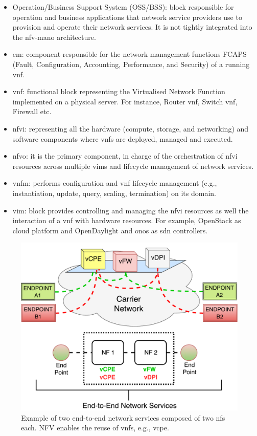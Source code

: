 \begin{itemize}
\item Operation/Business Support System (OSS/BSS): block responsible for operation and business applications that network service providers use to provision and operate their network services. It is not tightly integrated into the \gls{nfv}-\gls{mano} architecture.
\item \gls{em}: component responsible for the network management functions FCAPS (Fault, Configuration, Accounting, Performance, and Security) of a running \gls{vnf}.
\item \gls{vnf}: functional block representing the Virtualised Network Function implemented on a physical server. For instance, Router \gls{vnf}, Switch \gls{vnf}, Firewall etc.
\item \gls{nfvi}: representing all the hardware (compute, storage, and networking) and software components where \glspl{vnf} are deployed, managed and executed. 
\item \gls{nfvo}: it is the primary component, in charge of the orchestration of \gls{nfvi} resources across multiple \glspl{vim} and lifecycle management of network services. 
\item \gls{vnfm}: performs configuration and \gls{vnf} lifecycle management (e.g., instantiation, update, query, scaling, termination) on its domain.
\item \gls{vim}: block provides controlling and managing the \gls{nfvi} resources as well the interaction of a \gls{vnf} with hardware resources. For example, OpenStack as cloud platform and OpenDaylight and \gls{onos} as \gls{sdn} controllers.
\end{itemize}

\begin{figure}[t]
  \centering
  \includegraphics[scale=.45]{Figures/02_Background/ns}
    \caption{Example of two end-to-end network services composed of two \glspl{nf} each. NFV enables the reuse of \glspl{vnf}, e.g., \gls{vcpe}.}
    \label{nffg}
\end{figure}

